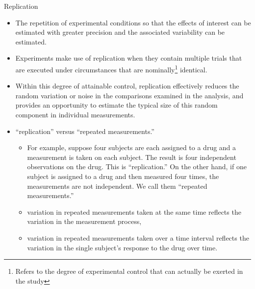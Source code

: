 \documentclass[
  ignorenonframetext,
  aspectratio=169]{beamer}
\providecommand{\tightlist}{%
  \setlength{\itemsep}{0pt}\setlength{\parskip}{0pt}}
\begin{document}
\begin{frame}{Replication}
\protect\hypertarget{replication}{}
\begin{itemize}[<+->]
\tightlist
\item
  The repetition of experimental conditions so that the effects of
  interest can be estimated with greater precision and the associated
  variability can be estimated.
\item
  Experiments make use of replication when they contain multiple
  \alert{trials} that are executed under circumstances that are
  nominally\footnote[frame]{Refers to the degree of experimental control that can actually be exerted in the study}
  identical.
\item
  Within this degree of attainable control, replication effectively
  reduces the random variation or noise in the comparisons examined in
  the analysis, and provides an opportunity to estimate the typical size
  of this random component in individual measurements.
\end{itemize}
\end{frame}

\begin{frame}{}
\protect\hypertarget{section-2}{}
\begin{itemize}[<+->]
\tightlist
\item
  ``replication'' versus ``repeated measurements.''

  \begin{itemize}[<+->]
  \tightlist
  \item
    For example, suppose four subjects are each assigned to a drug and a
    measurement is taken on each subject. The result is four independent
    observations on the drug. This is ``replication.'' On the other
    hand, if one subject is assigned to a drug and then measured four
    times, the measurements are not independent. We call them ``repeated
    measurements.''
  \item
    variation in repeated measurements taken at the same time reflects
    the variation in the measurement process,
  \item
    variation in repeated measurements taken over a time interval
    reflects the variation in the single subject's response to the drug
    over time.
  \end{itemize}
\end{itemize}
\end{frame}
\end{document}
